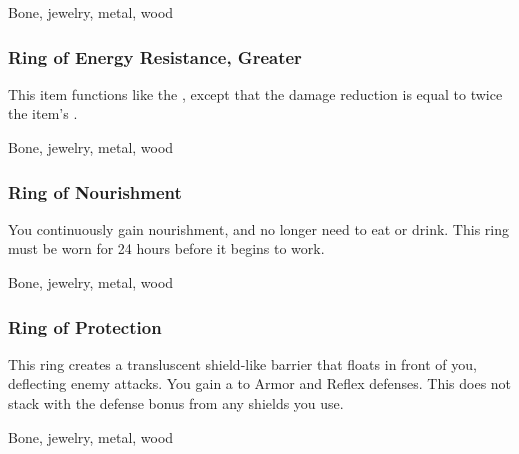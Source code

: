  


 Bone, jewelry, metal, wood


\lowercase{\hypertarget{item:Ring of Energy Resistance, Greater}{}}\label{item:Ring of Energy Resistance, Greater}
\hypertarget{item:Ring of Energy Resistance, Greater}{\subsubsection{Ring of Energy Resistance, Greater\hfill{}}}

This item functions like the , except that the damage reduction is equal to twice the item's .



 


 Bone, jewelry, metal, wood


\lowercase{\hypertarget{item:Ring of Nourishment}{}}\label{item:Ring of Nourishment}
\hypertarget{item:Ring of Nourishment}{\subsubsection{Ring of Nourishment\hfill{}}}

You continuously gain nourishment, and no longer need to eat or drink.
This ring must be worn for 24 hours before it begins to work.



 


 Bone, jewelry, metal, wood


\lowercase{\hypertarget{item:Ring of Protection}{}}\label{item:Ring of Protection}
\hypertarget{item:Ring of Protection}{\subsubsection{Ring of Protection\hfill{}}}

This ring creates a transluscent shield-like barrier that floats in front of you, deflecting enemy attacks.
You gain a   to Armor and Reflex defenses.
This does not stack with the defense bonus from any shields you use.



 


 Bone, jewelry, metal, wood


